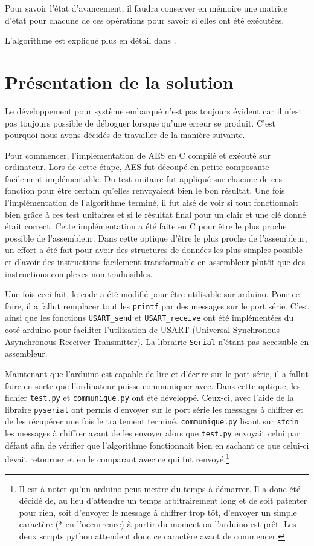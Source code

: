 \documentclass[letterpaper]{article}
\begin{document}
Pour savoir l'état d'avancement, il faudra conserver en mémoire une matrice d'état pour chacune de ces opérations pour savoir si elles ont été exécutées.

L'algorithme est expliqué plus en détail dans \cite{FernandesMedeiros2012}.

\section{Présentation de la solution}
Le développement pour système embarqué n'est pas toujours évident car il n'est pas toujours possible de déboguer lorsque qu'une erreur se produit.
C'est pourquoi nous avons décidés de travailler de la manière suivante.

Pour commencer, l'implémentation de AES en C compilé et exécuté sur ordinateur.
Lors de cette étape, AES fut découpé en petite composante facilement implémentable.
Du test unitaire fut appliqué sur chacune de ces fonction pour être certain qu'elles renvoyaient bien le bon résultat.
Une fois l'implémentation de l'algorithme terminé, il fut aisé de voir si tout fonctionnait bien grâce à ces test unitaires et si le résultat final pour un clair et une clé donné était correct.
Cette implémentation a été faite en C pour être le plus proche possible de l'assembleur.
Dans cette optique d'être le plus proche de l'assembleur, un effort a été fait pour avoir des structures de données les plus simples possible et d'avoir des instructions facilement transformable en assembleur plutôt que des instructions complexes non traduisibles.

Une fois ceci fait, le code a été modifié pour être utilisable sur arduino.
Pour ce faire, il a fallut remplacer tout les \texttt{printf} par des messages sur le port série.
C'est ainsi que les fonctions \texttt{USART\_send} et \texttt{USART\_receive} ont été implémentées du coté arduino pour faciliter l'utilisation de USART (Universal Synchronous Asynchronous Receiver Transmitter).
La librairie \texttt{Serial} n'étant pas accessible en assembleur.

Maintenant que l'arduino est capable de lire et d'écrire sur le port série, il a fallut faire en sorte que l'ordinateur puisse communiquer avec. Dans cette optique, les fichier \texttt{test.py} et \texttt{communique.py} ont été développé. Ceux-ci, avec l'aide de la libraire \texttt{pyserial} ont permis d'envoyer sur le port série les messages à chiffrer et de les récupérer une fois le traitement terminé. \texttt{communique.py} lisant sur \texttt{stdin} les messages à chiffrer avant de
les envoyer alors que \texttt{test.py} envoyait celui par défaut afin de vérifier que l'algorithme fonctionnait bien en sachant ce que celui-ci devait retourner et en le comparant avec ce qui fut renvoyé.\footnote{Il est à noter qu'un arduino peut mettre du temps à démarrer. Il a donc été décidé de, au lieu d'attendre un temps arbitrairement long et de soit patenter pour rien, soit d'envoyer le message à chiffrer trop tôt, d'envoyer un simple caractère (* en l'occurrence) à partir du
moment ou l'arduino est prêt. Les deux scripts python attendent donc ce caractère avant de commencer.}
\end{document}
